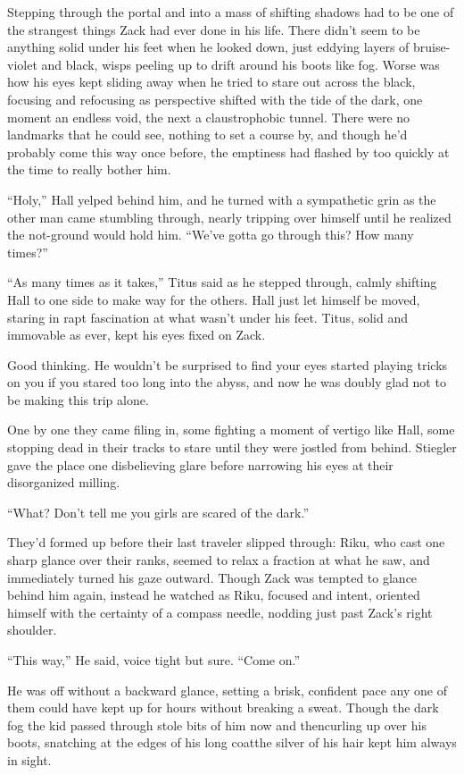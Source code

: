 
Stepping through the portal and into a mass of shifting shadows had to be one of the strangest things Zack had ever done in his life. There didn't seem to be anything solid under his feet when he looked down, just eddying layers of bruise-violet and black, wisps peeling up to drift around his boots like fog. Worse was how his eyes kept sliding away when he tried to stare out across the black, focusing and refocusing as perspective shifted with the tide of the dark, one moment an endless void, the next a claustrophobic tunnel. There were no landmarks that he could see, nothing to set a course by, and though he'd probably come this way once before, the emptiness had flashed by too quickly at the time to really bother him.

``Holy,'' Hall yelped behind him, and he turned with a sympathetic grin as the other man came stumbling through, nearly tripping over himself until he realized the not-ground would hold him. ``We've gotta go through this? How many times?''

``As many times as it takes,'' Titus said as he stepped through, calmly shifting Hall to one side to make way for the others. Hall just let himself be moved, staring in rapt fascination at what wasn't under his feet. Titus, solid and immovable as ever, kept his eyes fixed on Zack.

Good thinking. He wouldn't be surprised to find your eyes started playing tricks on you if you stared too long into the abyss, and now he was doubly glad not to be making this trip alone.

\scenechange

One by one they came filing in, some fighting a moment of vertigo like Hall, some stopping dead in their tracks to stare until they were jostled from behind. Stiegler gave the place one disbelieving glare before narrowing his eyes at their disorganized milling. 

``What? Don't tell me you girls are scared of the dark.''

They'd formed up before their last traveler slipped through: Riku, who cast one sharp glance over their ranks, seemed to relax a fraction at what he saw, and immediately turned his gaze outward. Though Zack was tempted to glance behind him again, instead he watched as Riku, focused and intent, oriented himself with the certainty of a compass needle, nodding just past Zack's right shoulder.

``This way,'' He said, voice tight but sure. ``Come on.''

He was off without a backward glance, setting a brisk, confident pace any one of them could have kept up for hours without breaking a sweat. Though the dark fog the kid passed through stole bits of him now and then\textemdash curling up over his boots, snatching at the edges of his long coat\textemdash the silver of his hair kept him always in sight.

